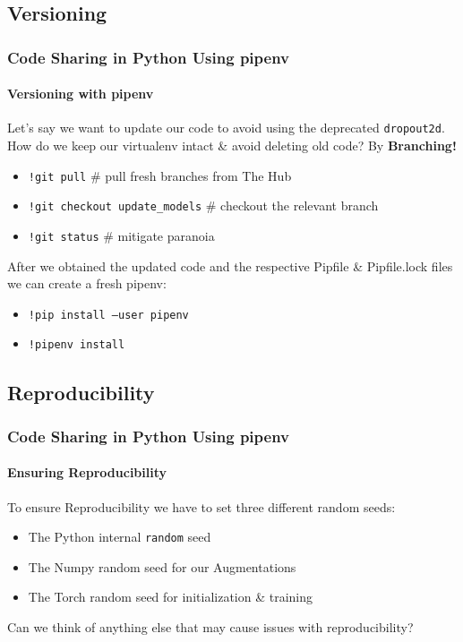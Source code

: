 \documentclass{beamer}
\begin{document}
\subsection{Versioning}
\begin{frame}
\frametitle{Code Sharing in Python Using pipenv}
\framesubtitle{Versioning with pipenv}
Let's say we want to update our code to avoid using the deprecated \texttt{dropout2d}.\\
\medskip
How do we keep our virtualenv intact \& avoid deleting old code?
\medskip
By \textbf{Branching!}
\begin{itemize}
    \item \texttt{!git pull} \# pull fresh branches from The Hub
    \item \texttt{!git checkout update\_models} \# checkout the relevant branch
    \item \texttt{!git status} \# mitigate paranoia
\end{itemize}
After we obtained the updated code and the respective Pipfile \& Pipfile.lock files we can create a fresh pipenv:
\begin{itemize}
    \item \texttt{!pip install --user pipenv}
    \item \texttt{!pipenv install}
\end{itemize}
\end{frame}

\subsection{Reproducibility}
\begin{frame}
\frametitle{Code Sharing in Python Using pipenv}
\framesubtitle{Ensuring Reproducibility}
To ensure Reproducibility we have to set three different random seeds:
\medskip
\begin{itemize}
    \item The Python internal \texttt{random} seed
    \item The Numpy random seed for our Augmentations
    \item The Torch random seed for initialization \& training
\end{itemize}
\medskip
Can we think of anything else that may cause issues with reproducibility?
\end{frame}
\end{document}
